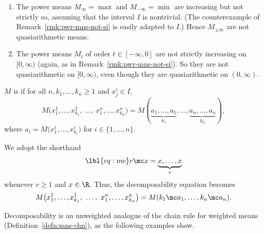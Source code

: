 \begin{examples}
\begin{enumerate}
\item
{}
The power means $M_\infty = \max$ and $M_{-\infty} = \min$ are increasing
but not strictly so, assuming that the interval $I$ is nontrivial.  (The
counterexample of Remark~\ref{rmk:pwr-mns-not-si} is easily adapted to
$I$.)  Hence $M_{\pm\infty}$ are not quasiarithmetic means.

\item
The power means $M_t$ of order $t \in [-\infty, 0]$ are not strictly
increasing on $[0, \infty)$ (again, as in Remark~\ref{rmk:pwr-mns-not-si}).
  So they are not quasiarithmetic on $[0, \infty)$, even though they are
    quasiarithmetic on $(0, \infty)$.
\end{enumerate}
\end{examples}

\begin{defn}
$M$ is  if for all $n, k_1, \ldots,
k_n \geq 1$ and $x^i_j \in I$,
\[
M\bigl(x^1_1, \ldots, x^1_{k_1}, \ \ldots, \ x^n_1, \ldots, x^n_{k_n}\bigr)
=
M(\underbrace{a_1, \ldots, a_1}_{k_1}, 
\ldots, 
\underbrace{a_n, \ldots, a_n}_{k_n}),
\]
where $a_i = M\bigl(x^i_1, \ldots, x^i_{k_i}\bigr)$ for $i \in \{1, \ldots,
n\}$.
\end{defn}

We adopt the shorthand 
% 
\begin{equation}
\lbl{eq:mc}
r \mc x 
=
\underbrace{x, \ldots, x}_r
\end{equation}
% 
whenever $r \geq 1$ and $x \in \R$.  Thus, the decomposability equation
becomes
\[
M\bigl(x^1_1, \ldots, x^1_{k_1}, \ \ldots, \ x^n_1, \ldots, x^n_{k_n}\bigr)
=
M(k_1 \mc a_1, \ldots, k_n \mc a_n).
\]

Decomposability is an unweighted analogue of the
chain rule for weighted means (Definition~\ref{defn:mns-chn}), as the
following examples show.


